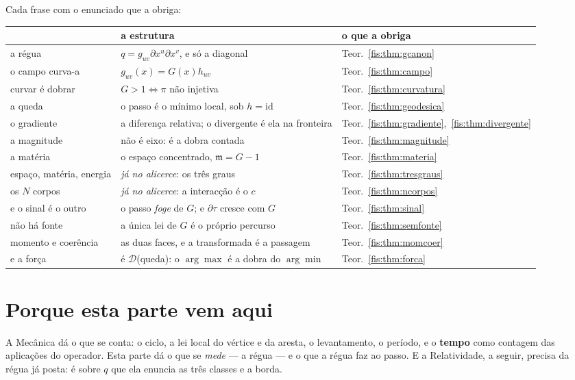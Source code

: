 \documentclass[livro.tex]{subfiles}
\begin{document}
\medskip\noindent Cada frase com o enunciado que a obriga:
\begin{center}\small
\begin{tabular}{@{}p{}p{}l@{}}
\toprule
 & \textbf{a estrutura} & \textbf{o que a obriga} \\
\midrule
a régua & $q=g_{uv}\partial x^{u}\partial x^{v}$, e só a diagonal & Teor.~\ref{fis:thm:gcanon} \\
o campo curva-a & $g_{uv}(x)=G(x)h_{uv}$ & Teor.~\ref{fis:thm:campo} \\
curvar é dobrar & $G>1\iff\pi$ não injetiva & Teor.~\ref{fis:thm:curvatura} \\
a queda & o passo é o mínimo local, sob $h=\mathrm{id}$ & Teor.~\ref{fis:thm:geodesica} \\
o gradiente & a diferença relativa; o divergente é ela na fronteira & Teor.~\ref{fis:thm:gradiente},~\ref{fis:thm:divergente} \\
a magnitude & não é eixo: é a dobra contada & Teor.~\ref{fis:thm:magnitude} \\
a matéria & o espaço concentrado, $\mathfrak{m}=G-1$ & Teor.~\ref{fis:thm:materia} \\
espaço, matéria, energia & \emph{já no alicerce}: os três graus & Teor.~\ref{fis:thm:tresgraus} \\
os $N$ corpos & \emph{já no alicerce}: a interacção é o $c$ & Teor.~\ref{fis:thm:ncorpos} \\
e o sinal é o outro & o passo \emph{foge} de $G$; e $\partial\tau$ cresce com $G$ & Teor.~\ref{fis:thm:sinal} \\
não há fonte & a única lei de $G$ é o próprio percurso & Teor.~\ref{fis:thm:semfonte} \\
momento e coerência & as duas faces, e a transformada é a passagem & Teor.~\ref{fis:thm:momcoer} \\
e a força & é $\mathcal{D}$(queda): o $\arg\max$ é a dobra do $\arg\min$ & Teor.~\ref{fis:thm:forca} \\
\bottomrule
\end{tabular}
\end{center}

\section{Porque esta parte vem aqui}\label{fis:grav-porque}

\noindent A Mecânica dá o que se conta: o ciclo, a lei local do vértice e da
aresta, o levantamento, o período, e o \textbf{tempo} como contagem das
aplicações do operador. Esta parte dá o que se \emph{mede} --- a régua --- e o
que a régua faz ao passo. E a Relatividade, a seguir, precisa da régua já posta:
é sobre $q$ que ela enuncia as três classes e a borda.
\end{document}
